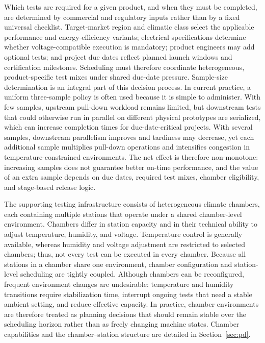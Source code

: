 \documentclass[11pt]{article}
\begin{document}
Which tests are required for a given product, and when they must be completed, are determined by commercial and regulatory inputs rather than by a fixed universal checklist. Target-market region and climatic class select the applicable performance and energy-efficiency variants; electrical specifications determine whether voltage-compatible execution is mandatory; product engineers may add optional tests; and project due dates reflect planned launch windows and certification milestones. Scheduling must therefore coordinate heterogeneous, product-specific test mixes under shared due-date pressure. Sample-size determination is an integral part of this decision process. In current practice, a uniform three-sample policy is often used because it is simple to administer. With few samples, upstream pull-down workload remains limited, but downstream tests that could otherwise run in parallel on different physical prototypes are serialized, which can increase completion times for due-date-critical projects. With several samples, downstream parallelism improves and tardiness may decrease, yet each additional sample multiplies pull-down operations and intensifies congestion in temperature-constrained environments. The net effect is therefore non-monotone: increasing samples does not guarantee better on-time performance, and the value of an extra sample depends on due dates, required test mixes, chamber eligibility, and stage-based release logic.

The supporting testing infrastructure consists of heterogeneous climate chambers, each containing multiple stations that operate under a shared chamber-level environment. Chambers differ in station capacity and in their technical ability to adjust temperature, humidity, and voltage. Temperature control is generally available, whereas humidity and voltage adjustment are restricted to selected chambers; thus, not every test can be executed in every chamber. Because all stations in a chamber share one environment, chamber configuration and station-level scheduling are tightly coupled. Although chambers can be reconfigured, frequent environment changes are undesirable: temperature and humidity transitions require stabilization time, interrupt ongoing tests that need a stable ambient setting, and reduce effective capacity. In practice, chamber environments are therefore treated as planning decisions that should remain stable over the scheduling horizon rather than as freely changing machine states. Chamber capabilities and the chamber--station structure are detailed in Section~\ref{sec:pd}.
\end{document}
